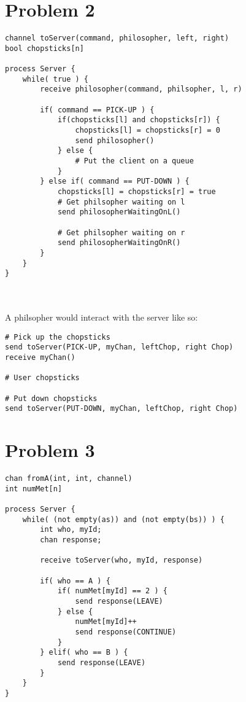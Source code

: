 \documentclass{article}%
\begin{document}
\section*{Problem 2}
\begin{lstlisting}[frame=single]
channel toServer(command, philosopher, left, right)
bool chopsticks[n]

process Server {
    while( true ) {
        receive philosopher(command, philsopher, l, r)

        if( command == PICK-UP ) {
            if(chopsticks[l] and chopsticks[r]) {
                chopsticks[l] = chopsticks[r] = 0
                send philosopher()
            } else {
                # Put the client on a queue
            }
        } else if( command == PUT-DOWN ) {
            chopsticks[l] = chopsticks[r] = true
            # Get philsopher waiting on l
            send philosopherWaitingOnL()

            # Get philsopher waiting on r
            send philosopherWaitingOnR()
        }
    }
}
\end{lstlisting}\\
\\
A philsopher would interact with the server like so:
\begin{lstlisting}[frame=single]
# Pick up the chopsticks
send toServer(PICK-UP, myChan, leftChop, right Chop)
receive myChan()

# User chopsticks

# Put down chopsticks
send toServer(PUT-DOWN, myChan, leftChop, right Chop)
\end{lstlisting}

\clearpage
\section*{Problem 3}
\lstset{language=Python}
\begin{lstlisting}[frame=single]
chan fromA(int, int, channel)
int numMet[n]

process Server {
    while( (not empty(as)) and (not empty(bs)) ) {
        int who, myId;
        chan response;

        receive toServer(who, myId, response)

        if( who == A ) {
            if( numMet[myId] == 2 ) {
                send response(LEAVE)
            } else {
                numMet[myId]++
                send response(CONTINUE)
            }
        } elif( who == B ) {
            send response(LEAVE)
        }
    }
}

\end{lstlisting}
\end{document}
